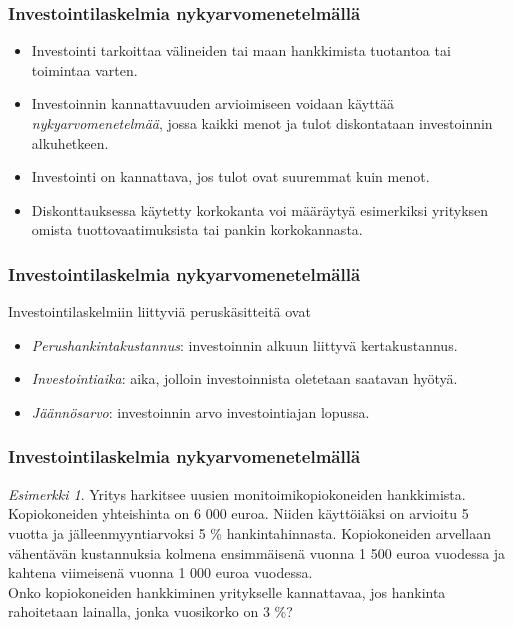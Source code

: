 \documentclass[]{beamer}\usepackage[]{graphicx}\usepackage[]{color}
\theoremstyle{remark}
\newtheorem{esim}{Esimerkki}
\newcommand{\pblock}{\\ \vspace{0.5cm}\pause}
\begin{document}
\begin{frame}
    \frametitle{Investointilaskelmia nykyarvomenetelmällä}
    \begin{itemize}
        \item {Investointi} tarkoittaa välineiden tai maan hankkimista tuotantoa tai toimintaa varten. \pause
        \item Investoinnin kannattavuuden arvioimiseen voidaan käyttää \emph{nykyarvomenetelmää}, jossa kaikki menot ja tulot diskontataan investoinnin alkuhetkeen.  \pause
        \item Investointi on kannattava, jos tulot ovat suuremmat kuin menot. \pause
        \item Diskonttauksessa käytetty korkokanta voi määräytyä esimerkiksi yrityksen omista tuottovaatimuksista tai pankin korkokannasta.
    \end{itemize}
\end{frame}

\begin{frame}
    \frametitle{Investointilaskelmia nykyarvomenetelmällä}
    Investointilaskelmiin liittyviä peruskäsitteitä ovat \pause
    \begin{itemize}
        \item \emph{Perushankintakustannus}: investoinnin alkuun liittyvä kertakustannus. \pause
        \item \emph{Investointiaika}: aika, jolloin investoinnista oletetaan saatavan hyötyä. \pause
        \item \emph{Jäännösarvo}: investoinnin arvo investointiajan lopussa.
    \end{itemize}
\end{frame}

\begin{frame}
\frametitle{Investointilaskelmia nykyarvomenetelmällä}
    \begin{esim}
    Yritys harkitsee uusien monitoimikopiokoneiden hankkimista.
    Kopiokoneiden yhteishinta on 6 000 euroa. Niiden käyttöiäksi on arvioitu 5 vuotta ja jälleenmyyntiarvoksi 5 \% hankintahinnasta.
    Kopiokoneiden arvellaan vähentävän kustannuksia kolmena ensimmäisenä vuonna 1 500 euroa vuodessa ja kahtena viimeisenä vuonna 1 000 euroa vuodessa.
    \pblock
    Onko kopiokoneiden hankkiminen yritykselle kannattavaa, jos hankinta rahoitetaan lainalla, jonka vuosikorko on 3 \%?
    \end{esim}
\end{frame}
\end{document}
